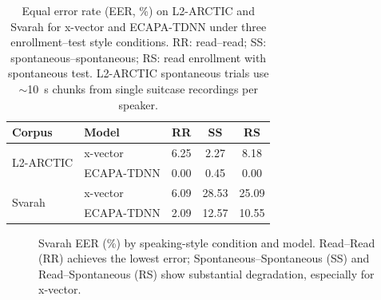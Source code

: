 \documentclass[cameraready]{Interspeech}
\begin{document}
\begin{table}[t]
  \caption{Equal error rate (EER, \%) on L2-ARCTIC and Svarah for x-vector and ECAPA-TDNN under three enrollment--test style conditions. RR: read--read; SS: spontaneous--spontaneous; RS: read enrollment with spontaneous test. L2-ARCTIC spontaneous trials use $\sim$\SI{10}{\second} chunks from single suitcase recordings per speaker.}
  \label{tab:results}
  \centering
  \begin{tabular}{llccc}
    \toprule
    Corpus & Model & RR & SS & RS \\
    \midrule
    \multirow{2}{*}{L2-ARCTIC} & x-vector & 6.25 & 2.27 & 8.18 \\
     & ECAPA-TDNN & 0.00 & 0.45 & 0.00 \\
    \midrule
    \multirow{2}{*}{Svarah} & x-vector & 6.09 & 28.53 & 25.09 \\
     & ECAPA-TDNN & 2.09 & 12.57 & 10.55 \\
    \bottomrule
  \end{tabular}
\end{table}

\begin{figure}[t]
  \centering
  \caption{Svarah EER (\%) by speaking-style condition and model. Read--Read (RR) achieves the lowest error; Spontaneous--Spontaneous (SS) and Read--Spontaneous (RS) show substantial degradation, especially for x-vector.}
  \label{fig:eer_compare}
\end{figure}
\end{document}
